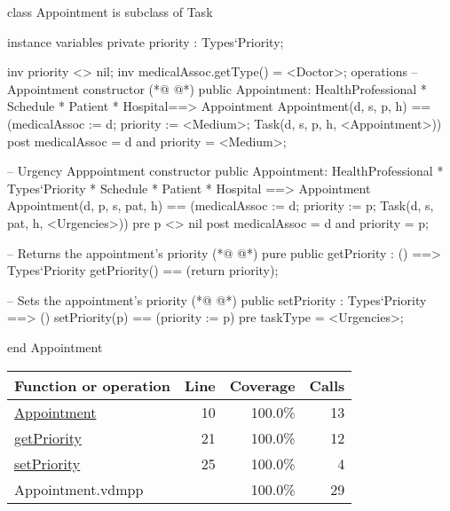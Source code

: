 \begin{vdmpp}[breaklines=true]
class Appointment is subclass of Task

instance variables
  private priority : Types`Priority;
  
  inv priority <> nil;
  inv medicalAssoc.getType() = <Doctor>;
operations
 -- Appointment constructor
(*@
\label{Appointment:10}
@*)
 public Appointment: HealthProfessional * Schedule * Patient * Hospital==> Appointment
  Appointment(d, s, p, h) == (medicalAssoc := d; priority := <Medium>; Task(d, s, p, h, <Appointment>))
 post medicalAssoc = d and priority = <Medium>;
 
 -- Urgency Apppointment constructor
 public Appointment: HealthProfessional * Types`Priority * Schedule * Patient * Hospital ==> Appointment
  Appointment(d, p, s, pat, h) == (medicalAssoc := d; priority := p; Task(d, s, pat, h, <Urgencies>))
 pre p <> nil
 post medicalAssoc = d and priority = p;

 -- Returns the appointment's priority
(*@
\label{getPriority:21}
@*)
 pure public getPriority : () ==> Types`Priority
  getPriority() == (return priority);

  -- Sets the appointment's priority
(*@
\label{setPriority:25}
@*)
  public setPriority : Types`Priority ==> ()
   setPriority(p) == (priority := p)
  pre taskType = <Urgencies>;
  
end Appointment
\end{vdmpp}
\bigskip
\begin{longtable}{|l|r|r|r|}
\hline
Function or operation & Line & Coverage & Calls \\
\hline
\hline
\hyperref[Appointment:10]{Appointment} & 10&100.0\% & 13 \\
\hline
\hyperref[getPriority:21]{getPriority} & 21&100.0\% & 12 \\
\hline
\hyperref[setPriority:25]{setPriority} & 25&100.0\% & 4 \\
\hline
\hline
Appointment.vdmpp & & 100.0\% & 29 \\
\hline
\end{longtable}

